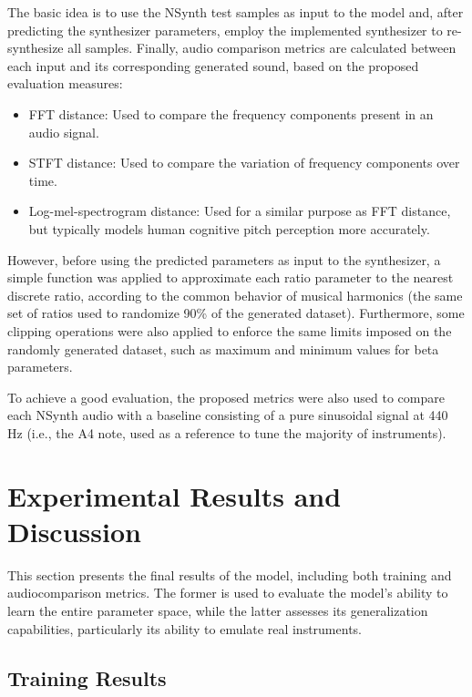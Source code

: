 \documentclass[10pt,conference]{IEEEtran}
\begin{document}
The basic idea is to use the NSynth test samples as input to the model and, after predicting the synthesizer parameters, employ the implemented synthesizer to re-synthesize all samples. Finally, audio comparison metrics are calculated between each input and its corresponding generated sound, based on the proposed evaluation measures:

\begin{itemize}
    \item FFT distance: Used to compare the frequency components present in an audio signal.
    \item STFT distance: Used to compare the variation of frequency components over time.
    \item Log-mel-spectrogram distance: Used for a similar purpose as FFT distance, but typically models human cognitive pitch perception more accurately.
\end{itemize}

However, before using the predicted parameters as input to the synthesizer, a simple function was applied to approximate each ratio parameter to the nearest discrete ratio, according to the common behavior of musical harmonics (the same set of ratios used to randomize 90\% of the generated dataset). Furthermore, some clipping operations were also applied to enforce the same limits imposed on the randomly generated dataset, such as maximum and minimum values for beta parameters.

To achieve a good evaluation, the proposed metrics were also used to compare each NSynth audio with a baseline consisting of a pure sinusoidal signal at 440 Hz (i.e., the A4 note, used as a reference to tune the majority of instruments).

\section{Experimental Results and Discussion}  \label{sec:experiments}

This section presents the final results of the model, including both training and audiocomparison metrics. The former is used to evaluate the model’s ability to learn the entire parameter space, while the latter assesses its generalization capabilities, particularly its ability to emulate real instruments.

\subsection{Training Results}
\end{document}
